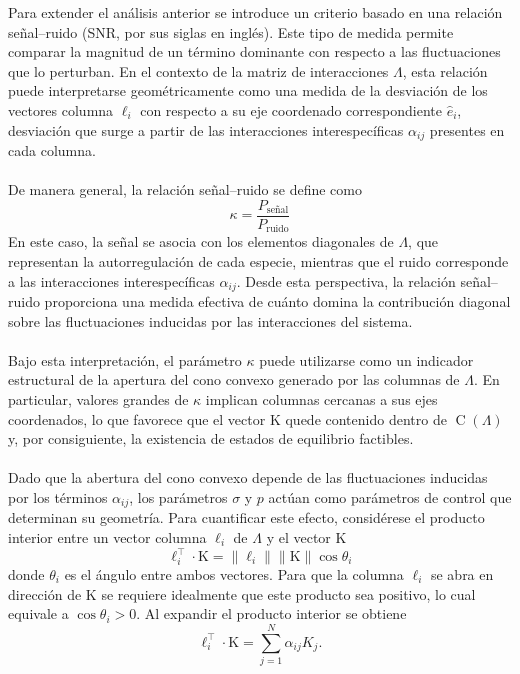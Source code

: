 Para extender el análisis anterior se introduce un criterio basado en una relación señal–ruido (SNR, por sus siglas en inglés). Este tipo de medida permite comparar la magnitud de un término dominante con respecto a las fluctuaciones que lo perturban. En el contexto de la matriz de interacciones $\Lambda$, esta relación puede interpretarse geométricamente como una medida de la desviación de los vectores columna $\ell_i$ con respecto a su eje coordenado correspondiente $\hat{e}_i$, desviación que surge a partir de las interacciones interespecíficas $\alpha_{ij}$ presentes en cada columna.\\
\\
De manera general, la relación señal–ruido se define como
$$\kappa = \frac{P_{\text{señal}}}{P_{\text{ruido}}}$$
En este caso, la señal se asocia con los elementos diagonales de $\Lambda$, que representan la autorregulación de cada especie, mientras que el ruido corresponde a las interacciones interespecíficas $\alpha_{ij}$. Desde esta perspectiva, la relación señal–ruido proporciona una medida efectiva de cuánto domina la contribución diagonal sobre las fluctuaciones inducidas por las interacciones del sistema.\\
\\
Bajo esta interpretación, el parámetro $\kappa$ puede utilizarse como un indicador estructural de la apertura del cono convexo generado por las columnas de $\Lambda$. En particular, valores grandes de $\kappa$ implican columnas cercanas a sus ejes coordenados, lo que favorece que el vector $\mathrm{K}$ quede contenido dentro de $\operatorname{C}(\Lambda)$ y, por consiguiente, la existencia de estados de equilibrio factibles.\\
\\
Dado que la abertura del cono convexo depende de las fluctuaciones inducidas por los términos $\alpha_{ij}$, los parámetros $\sigma$ y $p$ actúan como parámetros de control que determinan su geometría. Para cuantificar este efecto, considérese el producto interior entre un vector columna $\ell_i$ de $\Lambda$ y el vector $\mathrm{K}$
$$\ell_i^\top\cdot\mathrm{K}=\|\ell_i\|\|\mathrm{K}\|\cos\theta_i$$
donde $\theta_i$ es el ángulo entre ambos vectores. Para que la columna $\ell_i$ se abra en dirección de $\mathrm{K}$ se requiere idealmente que este producto sea positivo, lo cual equivale a $\cos\theta_i>0$. Al expandir el producto interior se obtiene
\begin{equation}\label{eqn:Señal-Ruido}
	\ell_i^\top\cdot\mathrm{K}
	= \sum_{j=1}^{N}\alpha_{ij}K_j.
\end{equation}
